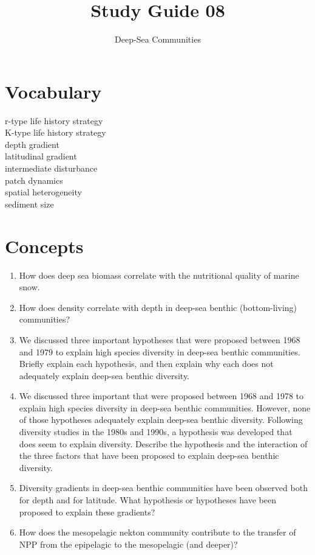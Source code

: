 \documentclass[nofonts, letterpaper]{tufte-handout}
\title{Study Guide 08}
\author{Deep-Sea Communities}
\date{} %
\begin{document}
\maketitle	%


\section{Vocabulary}
\vspace{-1\baselineskip}
\begin{multicols}{2}
r-type life history strategy \\
K-type life history strategy \\
depth gradient \\
latitudinal gradient \\
intermediate disturbance \\
patch dynamics \\
spatial heterogeneity \\
sediment size
\end{multicols}

\section{Concepts}

\begin{enumerate}
\item
  How does deep sea biomass correlate with the nutritional quality of
  marine snow.
\item
  How does density correlate with depth in deep-sea benthic
  (bottom-living) communities?
\item
  We discussed three important hypotheses that were proposed between
  1968 and 1979 to explain high species diversity in deep-sea benthic
  communities. Briefly explain each hypothesis, and then explain why
  each does not adequately explain deep-sea benthic diversity.
\item
  We discussed three important that were proposed between 1968 and 1978
  to explain high species diversity in deep-sea benthic communities.
  However, none of those hypotheses adequately explain deep-sea benthic
  diversity. Following diversity studies in the 1980s and 1990s, a
  hypothesis was developed that does seem to explain diversity. Describe
  the hypothesis and the interaction of the three factors that have been
  proposed to explain deep-sea benthic diversity.
\item
  Diversity gradients in deep-sea benthic communities have been observed
  both for depth and for latitude. What hypothesis or hypotheses have
  been proposed to explain these gradients?
\item
  How does the mesopelagic nekton community contribute to the transfer
  of NPP from the epipelagic to the mesopelagic (and deeper)?
 \end{enumerate}
\end{document}
